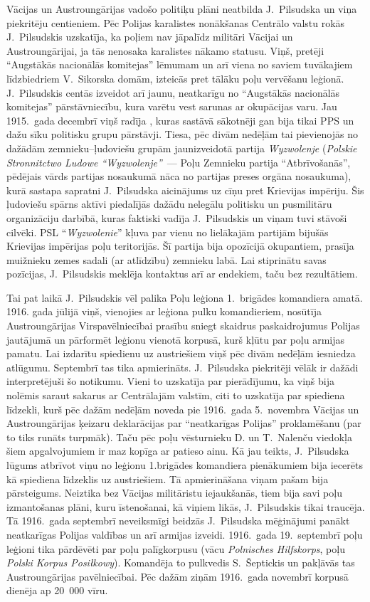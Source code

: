 \documentclass[twoside,a5paper,12pt,fleqn,openany]{extbook}
\newcommand{\pltxti}[1]{\textit{\textpolish{#1}}}
\newcommand{\detxti}[1]{\textit{\textgerman{#1}}}
\begin{document}
Vācijas un Austroungārijas vadošo politiķu plāni neatbilda J.~Pilsudska un viņa piekritēju centieniem. Pēc Polijas karalistes nonākšanas Centrālo valstu rokās J.~Pilsudskis uzskatīja, ka poļiem nav jāpalīdz militāri Vācijai un Austroungārijai, ja tās nenosaka karalistes nākamo statusu. Viņš, pretēji ``Augstākās nacionālās komitejas'' lēmumam un arī viena no saviem tuvākajiem līdzbiedriem V.~Sikorska domām, izteicās pret tālāku poļu vervēšanu leģionā. J.~Pilsudskis centās izveidot arī jaunu, neatkarīgu no ``Augstākās nacionālās komitejas'' pārstāvniecību, kura varētu vest sarunas ar okupācijas varu. Jau 1915.~gada decembrī viņš radīja , kuras sastāvā sākotnēji gan bija tikai PPS un dažu sīku politisku grupu pārstāvji. Tiesa, pēc divām nedēļām tai pievienojās no dažādām zemnieku--ļudoviešu grupām jaunizveidotā partija \pltxti{Wyzwolenje} (\pltxti{Polskie Stronnitctwo Ludowe ``Wyzwolenje''}~--- Poļu Zemnieku partija ``Atbrīvošanās'', pēdējais vārds partijas nosaukumā nāca no partijas preses orgāna nosaukuma), kurā sastapa sapratni J.~Pilsudska aicinājums uz cīņu pret Krievijas impēriju. Šis ļudoviešu spārns aktīvi piedalījās dažādu nelegālu politisku un pusmilitāru organizāciju darbībā, kuras faktiski vadīja J.~Pilsudskis un viņam tuvi stāvoši cilvēki. PSL ``\pltxti{Wyzwolenie}'' kļuva par vienu no lielākajām partijām bijušās Krievijas impērijas poļu teritorijās. Šī partija bija opozīcijā okupantiem, prasīja muižnieku zemes sadali (ar atlīdzību) zemnieku labā. Lai stiprinātu savas pozīcijas, J.~Pilsudskis meklēja kontaktus arī ar endekiem, taču bez rezultātiem.

Tai pat laikā J.~Pilsudskis vēl palika Poļu leģiona 1.~brigādes komandiera amatā. 1916. gada jūlijā viņš, vienojies ar leģiona pulku komandieriem, nosūtīja Austroungārijas Virspavēlniecībai prasību sniegt skaidrus paskaidrojumus Polijas jautājumā un pārformēt leģionu vienotā korpusā, kurš kļūtu par poļu armijas pamatu. Lai izdarītu spiedienu uz austriešiem viņš pēc divām nedēļām iesniedza atlūgumu. Septembrī tas tika apmierināts. J.~Pilsudska piekritēji vēlāk ir dažādi interpretējuši šo notikumu. Vieni to uzskatīja par pierādījumu, ka viņš bija nolēmis saraut sakarus ar Centrālajām valstīm, citi to uzskatīja par spiediena līdzekli, kurš pēc dažām nedēļām noveda pie 1916.~gada 5.~novembra Vācijas un Austroungārijas ķeizaru deklarācijas par ``neatkarīgas Polijas'' proklamēšanu (par to tiks runāts turpmāk). Taču pēc poļu vēsturnieku D. un T.~Nalenču viedokļa šiem apgalvojumiem ir maz kopīga ar patieso ainu. Kā jau teikts, J.~Pilsudska lūgums atbrīvot viņu no leģionu 1.brigādes komandiera pienākumiem bija iecerēts kā spiediena līdzeklis uz austriešiem. Tā apmierināšana viņam pašam bija pārsteigums. Neiztika bez Vācijas militāristu iejaukšanās, tiem bija savi poļu izmantošanas plāni, kuru īstenošanai, kā viņiem likās, J.~Pilsudskis tikai traucēja. Tā 1916.~gada septembrī neveiksmīgi beidzās J.~Pilsudska mēģinājumi panākt neatkarīgas Polijas valdības un arī armijas izveidi. 1916.~gada 19.~septembrī poļu leģioni tika pārdēvēti par poļu palīgkorpusu (vācu \detxti{Polnisches Hilfskorps}, poļu \pltxti{Polski Korpus Posiłkowy}). Komandēja to pulkvedis S.~Šeptickis un pakļāvās tas Austroungārijas pavēlniecībai. Pēc dažām ziņām 1916.~gada novembrī korpusā dienēja ap 20~000 vīru.
\end{document}
